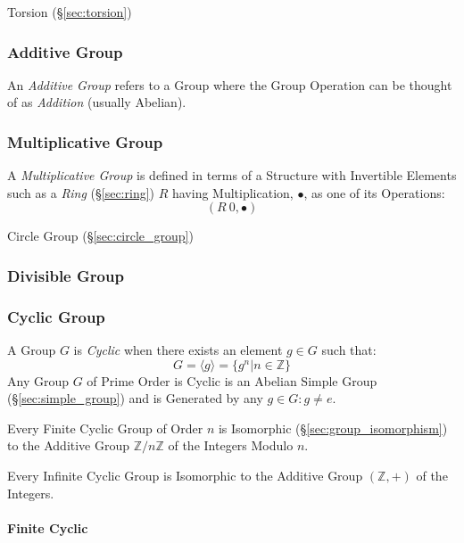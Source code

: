 Torsion (\S\ref{sec:torsion})



\subsubsection{Additive Group}\label{sec:additive_group}

An \emph{Additive Group} refers to a Group where the Group Operation
can be thought of as \emph{Addition} (usually Abelian).



\subsubsection{Multiplicative Group}\label{sec:multiplicative_group}

A \emph{Multiplicative Group} is defined in terms of a Structure with
Invertible Elements such as a \emph{Ring} (\S\ref{sec:ring}) $R$
having Multiplication, $\bullet$, as one of its Operations:
\[
  (R \ {0}, \bullet)
\]

Circle Group (\S\ref{sec:circle_group})



\subsubsection{Divisible Group}\label{sec:divisible_group}

\subsubsection{Cyclic Group}\label{sec:cyclic_group}

A Group $G$ is \emph{Cyclic} when there exists an element $g \in G$
such that:
\[
    G = \langle g \rangle = \{ g^n | n \in \mathbb{Z} \}
\]
Any Group $G$ of Prime Order is Cyclic is an Abelian Simple Group
(\S\ref{sec:simple_group}) and is Generated by any $g \in G : g \neq
e$.

Every Finite Cyclic Group of Order $n$ is Isomorphic
(\S\ref{sec:group_isomorphism}) to the Additive Group
$\mathbb{Z}/n\mathbb{Z}$ of the Integers Modulo $n$.

Every Infinite Cyclic Group is Isomorphic to the Additive Group
$(\mathbb{Z}, +)$ of the Integers.



\paragraph{Finite Cyclic}\label{sec:finite_cyclic}

